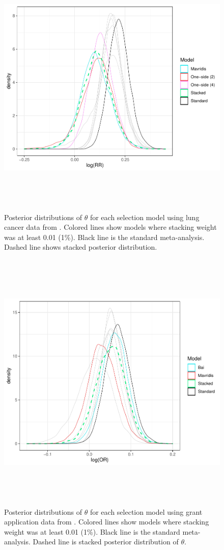 \documentclass[12pt]{article}   	%
\numberwithin{equation}{section}
\begin{document}
\begin{figure}
\includegraphics[height = 5in, width = 6.5in]{hackshaw_post.pdf}
\caption{Posterior distributions of $\theta$ for each selection model using lung cancer data from \citet{hackshaw1997}. Colored lines show models where stacking weight was at least 0.01 (1\%).
Black line is the standard meta-analysis.
Dashed line shows stacked posterior distribution.}
\label{fig:hackshaw}
\end{figure}


\begin{figure}
\includegraphics[height = 5in, width = 6.5in]{bornmann_post.pdf}
\caption{Posterior distributions of $\theta$ for each selection model using grant application data from \citet{bornmann2007gender}. Colored lines show models where stacking weight was at least 0.01 (1\%). Black line is the standard meta-analysis.
Dashed line is stacked posterior distribution of $\theta$.}
\label{fig:bornmann}
\end{figure}
\end{document}

